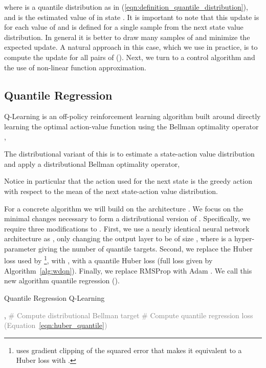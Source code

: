 \documentclass[letterpaper]{article}
\newcommand{\eqnref}[1]{(\ref{eqn:#1})}
\begin{document}
where  is a quantile distribution as in \eqnref{definition_quantile_distribution}, and  is the estimated value of  in state . It is important to note that this update is for each value of  and is defined for a single sample from the next state value distribution. In general it is better to draw many samples of  and minimize the expected update. A natural approach in this case, which we use in practice, is to compute the update for all pairs of (). Next, we turn to a control algorithm and the use of non-linear function approximation.

\subsection{Quantile Regression }

Q-Learning is an off-policy reinforcement learning algorithm built around directly learning the optimal action-value function using the Bellman optimality operator \cite{watkins1992q},


The distributional variant of this is to estimate a state-action value distribution and apply a distributional Bellman optimality operator,

Notice in particular that the action used for the next state is the greedy action with respect to the mean of the next state-action value distribution.

For a concrete algorithm we will build on the  architecture \cite{mnih15nature}. We focus on the minimal changes necessary to form a distributional version of . Specifically, we require three modifications to . First, we use a nearly identical neural network architecture as , only changing the output layer to be of size , where  is a hyper-parameter giving the number of quantile targets. Second, we replace the Huber loss used by \footnote{ uses gradient clipping of the squared error that makes it equivalent to a Huber loss with .},  with , with a quantile Huber loss (full loss given by Algorithm~\ref{alg:wdqn}). Finally, we replace RMSProp \cite{tieleman2012lecture} with Adam \cite{kingma2014adam}. We call this new algorithm quantile regression  ().


\begin{algorithm}[ht]
\caption{Quantile Regression Q-Learning}\label{alg:wdqn}
\begin{algorithmic}
\REQUIRE 
\INPUT , 
\STATE \textcolor{gray}{\# Compute distributional Bellman target}
\STATE 
\STATE 
\STATE 
\STATE \textcolor{gray}{\# Compute quantile regression loss (Equation~\ref{eqn:huber_quantile})}
\OUTPUT 
\end{algorithmic}
\end{algorithm}
\end{document}
